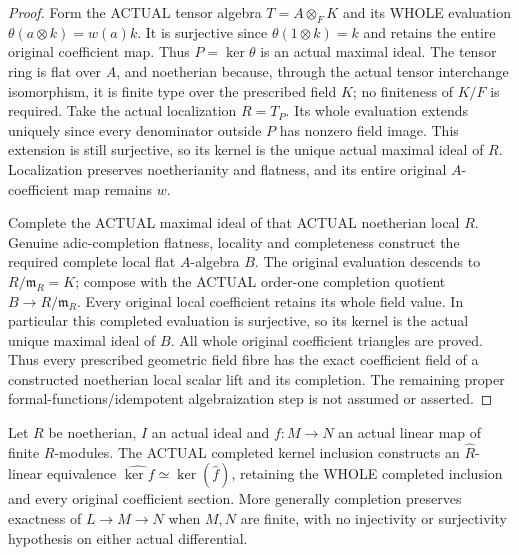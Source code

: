 \begin{proof}
Form the ACTUAL tensor algebra $T=A\otimes_F K$ and its WHOLE evaluation
$\theta(a\otimes k)=w(a)k$. It is surjective since $\theta(1\otimes k)=k$ and retains the entire
original coefficient map. Thus $P=\ker\theta$ is an actual maximal ideal. The tensor ring is flat
over $A$, and noetherian because, through the actual tensor interchange isomorphism, it is finite
type over the prescribed field $K$; no finiteness of $K/F$ is required. Take the actual localization
$R=T_P$. Its whole evaluation extends uniquely since every denominator outside $P$ has nonzero
field image. This extension is still surjective, so its kernel is the unique actual maximal ideal of $R$.
Localization preserves noetherianity and flatness, and its entire original $A$-coefficient map remains $w$.

Complete the ACTUAL maximal ideal of that ACTUAL noetherian local $R$. Genuine adic-completion
flatness, locality and completeness construct the required complete local flat $A$-algebra $B$.
The original evaluation descends to $R/\mathfrak m_R=K$; compose with the ACTUAL order-one
completion quotient $B\to R/\mathfrak m_R$. Every original local coefficient retains its whole field
value. In particular this completed evaluation is surjective, so its kernel is the actual unique maximal
ideal of $B$. All whole original coefficient triangles are proved. Thus every prescribed geometric
field fibre has the exact coefficient field of a constructed noetherian local scalar lift and its completion.
The remaining proper formal-functions/idempotent algebraization step is not assumed or asserted.
\end{proof}

\begin{lemma}\label{lem:fc-adic-completion-kernel}
\leanok
Let $R$ be noetherian, $I$ an actual ideal and $f\colon M\to N$ an actual linear map of finite
$R$-modules. The ACTUAL completed kernel inclusion constructs an $\widehat R$-linear equivalence
$\widehat{\ker f}\simeq\ker(\widehat f)$, retaining the WHOLE completed inclusion and every original
coefficient section. More generally completion preserves exactness of $L\to M\to N$ when $M,N$
are finite, with no injectivity or surjectivity hypothesis on either actual differential.
\end{lemma}


